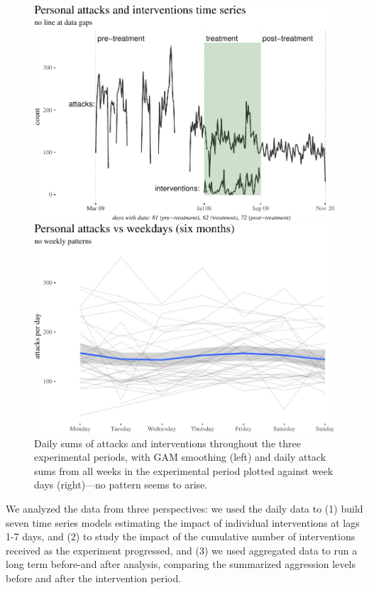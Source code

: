 \documentclass[preprint,12pt]{elsarticle}
\begin{document}
\begin{figure}
\begin{center}\includegraphics[width=0.88\linewidth]{figures/periodsPlot-1} 

\includegraphics[width=0.88\linewidth]{figures/periodsPlot-2} \end{center}
\caption{Daily sums of attacks and interventions throughout the three experimental periods, with GAM smoothing (left) and daily attack sums from all  weeks in the experimental period plotted against week days (right)---no pattern seems to arise.}
\label{fig:periodsPlot}
\end{figure}


We analyzed the data from three perspectives: we used the daily data to
(1) build seven time series models estimating the impact of individual
interventions at lags 1-7 days, and (2) to study the impact of the
cumulative number of  interventions received as the experiment
progressed, and (3) we used aggregated data to run a long term
before-and after analysis, comparing the summarized aggression levels
before and after the intervention period.
\end{document}
